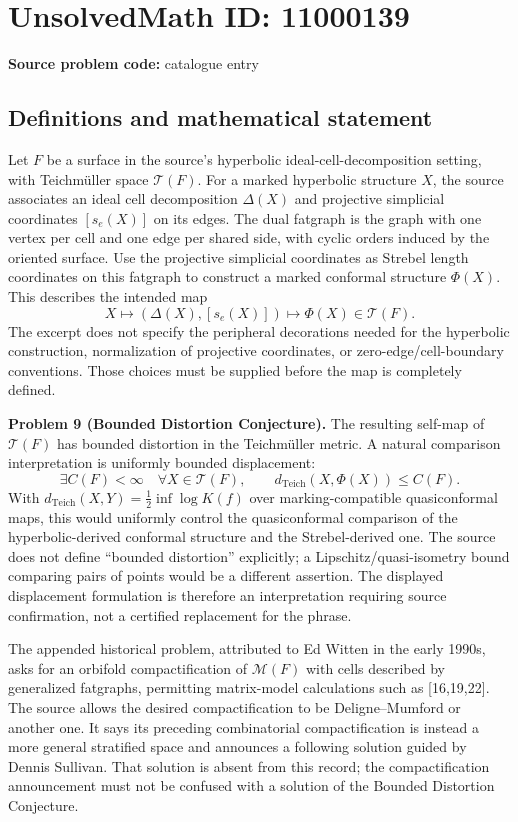 \documentclass[11pt]{article}
\begin{document}
\section*{UnsolvedMath ID: 11000139}
\textbf{Source problem code:} catalogue entry
\subsection{Definitions and mathematical statement}
Let $F$ be a surface in the source's hyperbolic ideal-cell-decomposition setting, with Teichm\"uller space $\mathcal T(F)$. For a marked hyperbolic structure $X$, the source associates an ideal cell decomposition $\Delta(X)$ and projective simplicial coordinates $[s_e(X)]$ on its edges. The dual fatgraph is the graph with one vertex per cell and one edge per shared side, with cyclic orders induced by the oriented surface. Use the projective simplicial coordinates as Strebel length coordinates on this fatgraph to construct a marked conformal structure $\Phi(X)$. This describes the intended map
\[
 X\longmapsto(\Delta(X),[s_e(X)])\longmapsto\Phi(X)\in\mathcal T(F).
\]
The excerpt does not specify the peripheral decorations needed for the hyperbolic construction, normalization of projective coordinates, or zero-edge/cell-boundary conventions. Those choices must be supplied before the map is completely defined.

\textbf{Problem 9 (Bounded Distortion Conjecture).} The resulting self-map of $\mathcal T(F)$ has bounded distortion in the Teichm\"uller metric. A natural comparison interpretation is uniformly bounded displacement:
\[
 \exists C(F)<\infty\quad\forall X\in\mathcal T(F),\qquad
 d_{\mathrm{Teich}}(X,\Phi(X))\le C(F).
\]
With $d_{\mathrm{Teich}}(X,Y)=\tfrac12\inf\log K(f)$ over marking-compatible quasiconformal maps, this would uniformly control the quasiconformal comparison of the hyperbolic-derived conformal structure and the Strebel-derived one. The source does not define ``bounded distortion'' explicitly; a Lipschitz/quasi-isometry bound comparing pairs of points would be a different assertion. The displayed displacement formulation is therefore an interpretation requiring source confirmation, not a certified replacement for the phrase.

The appended historical problem, attributed to Ed Witten in the early 1990s, asks for an orbifold compactification of $\mathcal M(F)$ with cells described by generalized fatgraphs, permitting matrix-model calculations such as [16,19,22]. The source allows the desired compactification to be Deligne--Mumford or another one. It says its preceding combinatorial compactification is instead a more general stratified space and announces a following solution guided by Dennis Sullivan. That solution is absent from this record; the compactification announcement must not be confused with a solution of the Bounded Distortion Conjecture.
\end{document}
